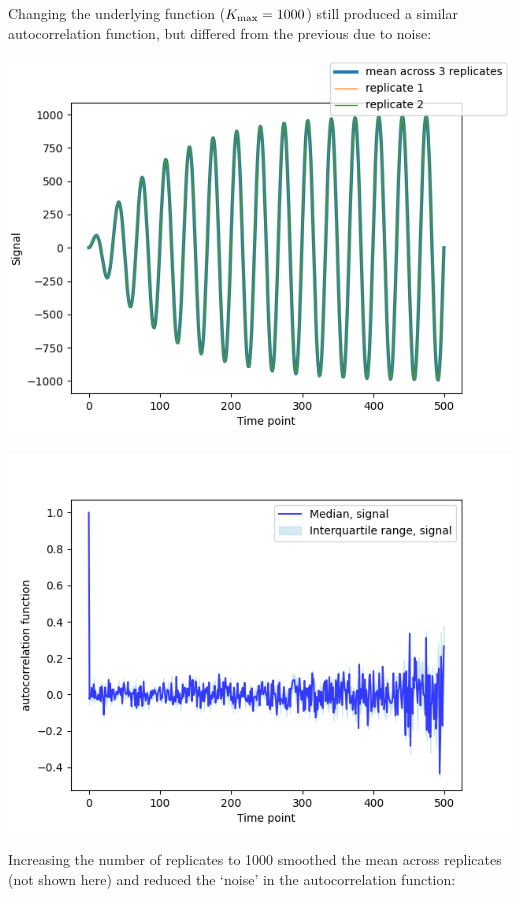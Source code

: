 \begin{enumerate}
\begin{enumerate}
\begin{enumerate}
Changing the underlying function (\(K_{\rm{max}} = 1000\)) still produced a similar autocorrelation function, but differed from the previous due to noise:
\begin{center}
\includegraphics[width=.9\linewidth]{nonstat_kmax1000_samephase_3rep_mean.png}
\end{center}
\begin{center}
\includegraphics[width=.9\linewidth]{nonstat_kmax1000_samephase_3rep_acf.png}
\end{center}

Increasing the number of replicates to 1000 smoothed the mean across replicates (not shown here) and reduced the `noise' in the autocorrelation function:


\end{enumerate}
\end{enumerate}
\end{enumerate}

